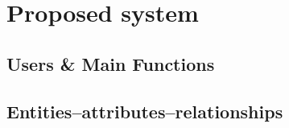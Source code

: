 \section{Proposed system}

\subsection{Users \& Main Functions}


\subsection{Entities–attributes–relationships}
